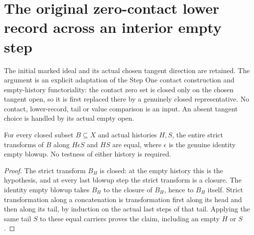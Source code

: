 \section{The original zero-contact lower record across an interior empty step}

The initial marked ideal and its actual chosen tangent direction are retained.
The argument is an explicit adaptation of the Step One contact construction
and empty-history functoriality: the contact zero set is closed only on the
chosen tangent open, so it is first replaced there by a genuinely closed
representative.  No contact, lower-record, tail or value comparison is an
input.  An absent tangent choice is handled by its actual empty open.

\begin{lemma}
\label{hir:original-interior-empty-closed-strict-carrier}
\leanok
{}
For every closed subset $B\subseteq X$ and actual histories $H,S$,
the entire strict transforms of $B$ along $H\epsilon S$ and $HS$ are equal,
where $\epsilon$ is the genuine identity empty blowup.  No testness of either
history is required.
\end{lemma}
\begin{proof}
The strict transform $B_H$ is closed: at the empty history this is the
hypothesis, and at every last blowup step the strict transform is a closure.
The identity empty blowup takes $B_H$ to the closure of $B_H$, hence to $B_H$
itself.  Strict transformation along a concatenation is transformation first
along its head and then along its tail, by induction on the actual last steps
of that tail.  Applying the same tail $S$ to these equal carriers proves the
claim, including an empty $H$ or $S$.
\end{proof}

